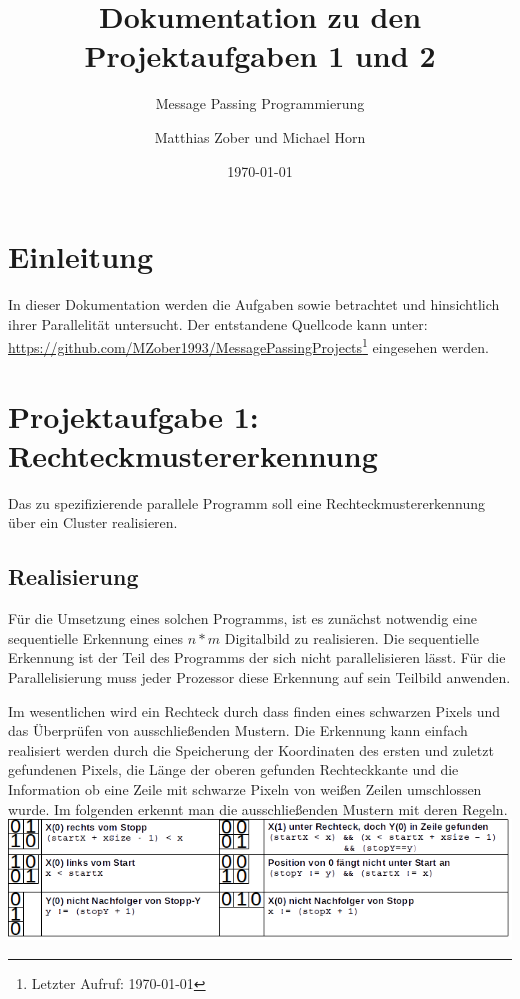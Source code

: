 	
					
\title{Dokumentation zu den Projektaufgaben 1 und 2}
\subtitle{Message Passing Programmierung}

\author{Matthias Zober und Michael Horn}
\date{\today}

\maketitle

\tableofcontents
\pagebreak

\section{Einleitung}
In dieser Dokumentation werden die Aufgaben  sowie  betrachtet und hinsichtlich ihrer Parallelität untersucht.
Der entstandene Quellcode kann unter:\\
\url{https://github.com/MZober1993/MessagePassingProjects}\footnote{Letzter Aufruf: \today}
eingesehen werden.
\section{Projektaufgabe 1: Rechteckmustererkennung}
Das zu spezifizierende parallele Programm soll eine Rechteckmustererkennung über ein Cluster realisieren.
\subsection{Realisierung}

Für die Umsetzung eines solchen Programms, ist es zunächst notwendig eine sequentielle Erkennung eines $n*m$ Digitalbild zu realisieren.
Die sequentielle Erkennung ist der Teil des Programms der sich nicht parallelisieren lässt. Für die Parallelisierung muss jeder Prozessor diese Erkennung auf sein Teilbild anwenden.

Im wesentlichen wird ein Rechteck durch dass finden eines schwarzen Pixels und das Überprüfen von ausschließenden Mustern. Die Erkennung kann einfach realisiert werden durch die Speicherung der Koordinaten des ersten und zuletzt gefundenen Pixels, die Länge der oberen gefunden Rechteckkante und die Information ob eine Zeile mit schwarze Pixeln von weißen Zeilen umschlossen wurde. Im folgenden erkennt man die ausschließenden Mustern mit deren Regeln.
\includegraphics[scale=0.8]{mismatches.png}

